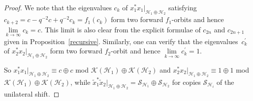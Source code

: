 \documentclass[11pt]{article}
\numberwithin{equation}{section}
\begin{document}
\begin{proof} We note that the eigenvalues $c_{k}$ of $x_{1}^{\ast}x_{1}%
|_{\mathcal{H}_{1}\oplus\mathcal{H}_{2}}$ satisfying $c_{k+2}=c-q^{-2}%
c+q^{-2}c_{k}=f_{1}( c_{k}) $ form two forward $f_{1}$-orbits and
hence $\lim\limits_{k\rightarrow\infty}c_{k}=c$. This limit is also clear from the
explicit formulae of $c_{2n}$ and $c_{2n+1}$ given in Proposition~\ref{recursive}.
Similarly, one can verify that the eigenvalues~$c_{k}^{\prime}$ of
$x_{2}^{\ast}x_{2}|_{\mathcal{H}_{1}\oplus\mathcal{H}_{2}}$ form two forward
$f_{2}$-orbit and hence $\lim\limits_{k\rightarrow\infty}c_{k}^{\prime}=1$.

So $x_{1}^{\ast}x_{1}|_{\mathcal{H}_{1}\oplus\mathcal{H}_{2}}\equiv c\oplus c$
mod $\mathcal{K}( \mathcal{H}_{1}) \oplus\mathcal{K}(
\mathcal{H}_{2}) $ and $x_{2}^{\ast}x_{2}|_{\mathcal{H}_{1}%
\oplus\mathcal{H}_{2}}\equiv1\oplus1$ mod $\mathcal{K}( \mathcal{H}%
_{1}) \oplus\mathcal{K}( \mathcal{H}_{2}) $, while
$\tilde{x}_{1}^{\ast}\tilde{x}_{2}|_{\mathcal{H}_{1}\oplus\mathcal{H}_{2}%
}=\mathcal{S}_{\mathcal{H}_{1}}\oplus\mathcal{S}_{\mathcal{H}_{2}}$ for copies
$\mathcal{S}_{\mathcal{H}_{i}}$ of the unilateral shift.


\end{proof}
\end{document}
